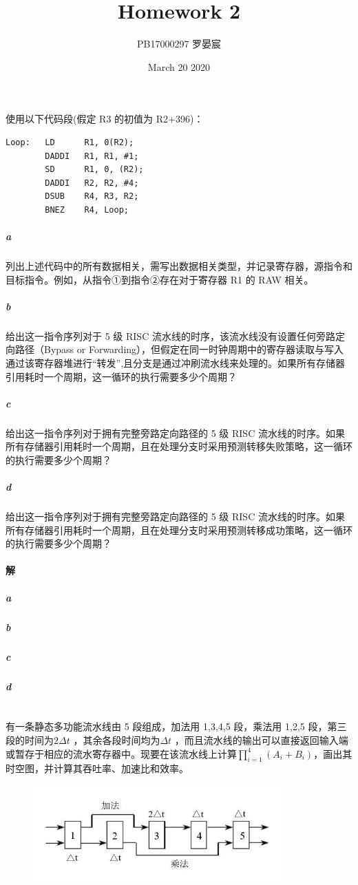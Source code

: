 \documentclass{article}
\title{Homework 2}
\author{PB17000297 罗晏宸}
\date{March 20 2020}
\begin{document}
\maketitle

\section{}
使用以下代码段(假定 R3 的初值为 R2+396)：

\begin{lstlisting}[language={[x86masm]Assembler}]
Loop:   LD      R1, 0(R2);
        DADDI   R1, R1, #1;
        SD      R1, 0, (R2);
        DADDI   R2, R2, #4;
        DSUB    R4, R3, R2;
        BNEZ    R4, Loop;
\end{lstlisting}
\subparagraph{a} 列出上述代码中的所有数据相关，需写出数据相关类型，并记录寄存器，源指令和目标指令。例如，从指令①到指令②存在对于寄存器 R1 的 RAW 相关。
\subparagraph{b} 给出这一指令序列对于 5 级 RISC 流水线的时序，该流水线没有设置任何旁路定向路径（Bypass or Forwarding），但假定在同一时钟周期中的寄存器读取与写入通过该寄存器堆进行“转发”,且分支是通过冲刷流水线来处理的。如果所有存储器引用耗时一个周期，这一循环的执行需要多少个周期？
\subparagraph{c} 给出这一指令序列对于拥有完整旁路定向路径的 5 级 RISC 流水线的时序。如果所有存储器引用耗时一个周期，且在处理分支时采用预测转移失败策略，这一循环的执行需要多少个周期？
\subparagraph{d} 给出这一指令序列对于拥有完整旁路定向路径的 5 级 RISC 流水线的时序。如果所有存储器引用耗时一个周期，且在处理分支时采用预测转移成功策略，这一循环的执行需要多少个周期？

\paragraph{解}
\subparagraph{a}
\subparagraph{b}
\subparagraph{c}
\subparagraph{d}

\section{}
有一条静态多功能流水线由 5 段组成，加法用 1,3,4,5 段，乘法用 1,2,5 段，第三段的时间为$2\Delta t$ ，其余各段时间均为$\Delta t$ ，而且流水线的输出可以直接返回输入端或暂存于相应的流水寄存器中。现要在该流水线上计算$\displaystyle \prod_{i = 1}^4(A_i + B_i)$，画出其时空图，并计算其吞吐率、加速比和效率。
\begin{figure}[h]
    \centering
    \includegraphics[width = 270pt]{2.jpg}
\end{figure}
\end{document}
